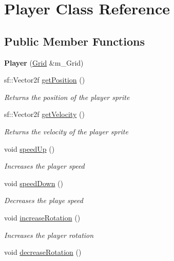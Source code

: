 \hypertarget{class_player}{}\section{Player Class Reference}
\label{class_player}
\subsection*{Public Member Functions}
\begin{DoxyCompactItemize}
\item 
\mbox{\label{class_player_a9dce6fc3b1978d2800dc4df434e3a3f9}} 
{\bfseries Player} (\mbox{\hyperlink{class_grid}{Grid}} \&m\+\_\+\+Grid)
\item 
sf\+::\+Vector2f \mbox{\hyperlink{class_player_a23356f99a9de86d3d47eadb679b332dc}{get\+Position}} ()
\begin{DoxyCompactList}\small\item\em Returns the position of the player sprite \end{DoxyCompactList}\item 
sf\+::\+Vector2f \mbox{\hyperlink{class_player_a363489e11401d5a1549e315c8c8aa220}{get\+Velocity}} ()
\begin{DoxyCompactList}\small\item\em Returns the velocity of the player sprite \end{DoxyCompactList}\item 
void \mbox{\hyperlink{class_player_ade1fb063559bb1ae1a07bf407cdeb5af}{speed\+Up}} ()
\begin{DoxyCompactList}\small\item\em Increases the player speed \end{DoxyCompactList}\item 
void \mbox{\hyperlink{class_player_a0a416eba4d3682c7a527d0639cfb2644}{speed\+Down}} ()
\begin{DoxyCompactList}\small\item\em Decreases the playe speed \end{DoxyCompactList}\item 
void \mbox{\hyperlink{class_player_a0f6f4bb800443551229331a68c3c3234}{increase\+Rotation}} ()
\begin{DoxyCompactList}\small\item\em Increases the player rotation \end{DoxyCompactList}\item 
void \mbox{\hyperlink{class_player_ad65092429c9fcb4d15f6af2591726b81}{decrease\+Rotation}} ()

\end{DoxyCompactItemize}
